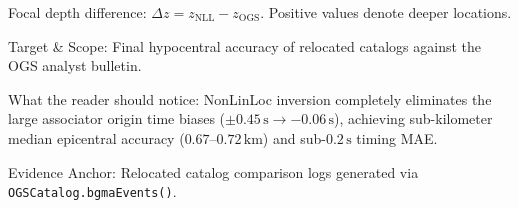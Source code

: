 \begin{table}[htbp]
\begin{threeparttable}
\begin{tablenotes}[flushleft]
      \item[c] Focal depth difference: $\Delta z = z_{\mathrm{NLL}} - z_{\mathrm{OGS}}$. Positive values denote deeper locations.
      \item Target \& Scope: Final hypocentral accuracy of relocated catalogs against the OGS analyst bulletin.
      \item What the reader should notice: NonLinLoc inversion completely eliminates the large associator origin time biases ($\pm 0.45\,\unit{\second} \to -0.06\,\unit{\second}$), achieving sub-kilometer median epicentral accuracy ($0.67\text{--}0.72\,\unit{\kilo\meter}$) and sub-$0.2\,\unit{\second}$ timing MAE.
      \item Evidence Anchor: Relocated catalog comparison logs generated via \texttt{OGSCatalog.bgmaEvents()}.
    \end{tablenotes}
  \end{threeparttable}
\end{table}

